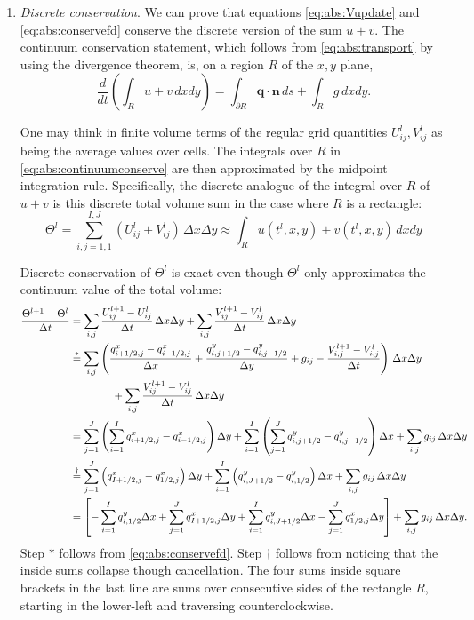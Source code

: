 \documentclass[11pt,final]{amsart}
\newcommand\bn{\mathbf{n}}
\newcommand\bq{\mathbf{q}}
\begin{document}
\begin{enumerate}
\item \emph{Discrete conservation}.  We can prove that equations \eqref{eq:abs:Vupdate} and \eqref{eq:abs:conservefd} conserve the discrete version of the sum $u+v$.  The continuum conservation statement, which follows from \eqref{eq:abs:transport} by using the divergence theorem, is, on a region $R$ of the $x,y$ plane,
\begin{equation}
\frac{d}{dt} \left(\int_R u + v\,dx dy\right) = \int_{\partial R} \bq \cdot \bn\,ds + \int_R g \,dx dy.  \label{eq:abs:continuumconserve}
\end{equation}

One may think in finite volume terms of the regular grid quantities $U_{ij}^l,V_{ij}^l$ as being the average values over cells.  The integrals over $R$ in \eqref{eq:abs:continuumconserve} are then approximated by the midpoint integration rule.  Specifically, the discrete analogue of the integral over $R$ of $u+v$ is this discrete total volume sum in the case where $R$ is a rectangle:
\begin{equation}
\Theta^l = \sum_{i,j=1,1}^{I,J} \left(U_{ij}^l + V_{ij}^l\right)\,\Delta x \Delta y \approx 
\int_R u(t^l,x,y) + v(t^l,x,y) \,dx dy\end{equation}

Discrete conservation of $\Theta^l$ is exact even though $\Theta^l$ only approximates the continuum value of the total volume:
\begin{align}
\frac{\Theta^{l+1} - \Theta^l}{\Delta t} &= \sum_{i,j} \frac{U_{ij}^{l+1} - U_{ij}^l}{\Delta t} \,\Delta x \Delta y   + \sum_{i,j} \frac{V_{ij}^{l+1} - V_{ij}^l}{\Delta t} \,\Delta x \Delta y   \label{eq:abs:discreteconserve} \\
  &\stackrel{\ast}{=} \sum_{i,j} \left(\frac{q^x_{i+1/2,j} - q^x_{i-1/2,j}}{\Delta x} + \frac{q^y_{i,j+1/2} - q^y_{i,j-1/2}}{\Delta y} + g_{ij} - \frac{V_{i,j}^{l+1} - V_{i,j}^l}{\Delta t}\right) \,\Delta x \Delta y  \notag \\
  &\qquad\qquad + \sum_{i,j} \frac{V_{ij}^{l+1} - V_{ij}^l}{\Delta t} \,\Delta x \Delta y   \notag \\
  &= \sum_{j=1}^{J} \left(\sum_{i=1}^{I}  q^x_{i+1/2,j} - q^x_{i-1/2,j}\right) \Delta y +  \sum_{i=1}^{I} \left(\sum_{j=1}^{J} q^y_{i,j+1/2} - q^y_{i,j-1/2}\right) \Delta x +  \sum_{i,j} g_{ij}\,\Delta x \Delta y  \notag \\
  &\stackrel{\dagger}{=} \sum_{j=1}^{J} \left(q^x_{I+1/2,j} - q^x_{1/2,j}\right) \Delta y +  \sum_{i=1}^{I} \left(q^y_{i,J+1/2} - q^y_{i,1/2}\right) \Delta x +  \sum_{i,j} g_{ij}\,\Delta x \Delta y \notag \\
  &= \left[- \sum_{i=1}^{I}  q^y_{i,1/2} \Delta x + \sum_{j=1}^{J} q^x_{I+1/2,j} \Delta y + \sum_{i=1}^{I} q^y_{i,J+1/2} \Delta x - \sum_{j=1}^{J} q^x_{1/2,j} \Delta y \right]  +  \sum_{i,j} g_{ij}\,\Delta x \Delta y. \notag
\end{align}
Step $\ast$ follows from \eqref{eq:abs:conservefd}.  Step $\dagger$ follows from noticing that the inside sums collapse though cancellation.  The four sums inside square brackets in the last line are sums over consecutive sides of the rectangle $R$, starting in the lower-left and traversing counterclockwise.


\end{enumerate}
\end{document}
